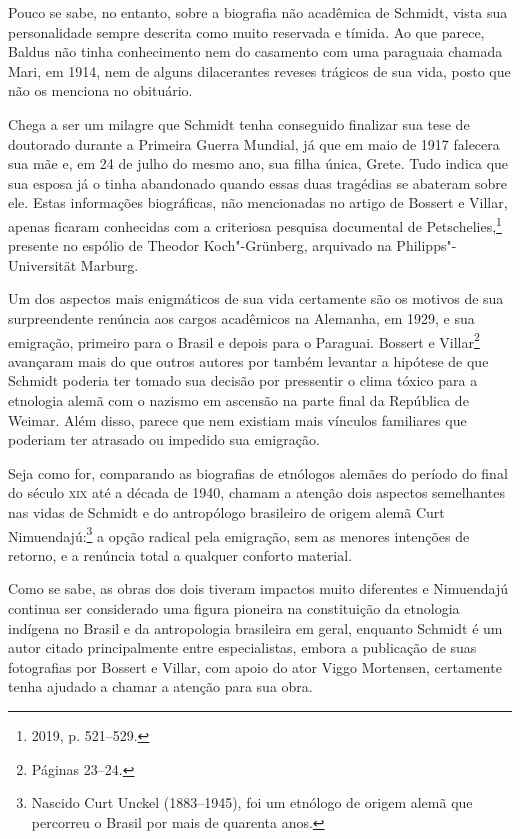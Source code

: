 Pouco se sabe, no entanto, sobre a biografia não acadêmica de Schmidt, vista sua personalidade sempre descrita como muito reservada e tímida. Ao que parece, Baldus não tinha conhecimento nem do casamento com uma paraguaia chamada Mari, em 1914, nem de alguns dilacerantes reveses trágicos de sua vida, posto que não os menciona no obituário.

Chega a ser um milagre que Schmidt tenha conseguido finalizar sua tese de doutorado durante a Primeira Guerra Mundial, já que em maio de 1917 falecera sua mãe e, em 24 de julho do mesmo ano, sua filha única, Grete. Tudo indica que sua esposa já o tinha abandonado quando essas duas tragédias se abateram sobre ele. Estas informações biográficas, não mencionadas no artigo de Bossert e Villar, apenas ficaram conhecidas com a criteriosa pesquisa documental de Petschelies,\footnote{2019, p. 521--529.} presente no espólio de Theodor Koch"-Grünberg, arquivado na Philipps"-Universität Marburg.

Um dos aspectos mais enigmáticos de sua vida certamente são os motivos de sua surpreendente renúncia aos cargos acadêmicos na Alemanha, em 1929, e sua emigração, primeiro para o Brasil e depois para o Paraguai. Bossert e Villar\footnote{Páginas 23--24.} avançaram mais do que outros autores por também levantar a hipótese de que Schmidt poderia ter tomado sua decisão por pressentir o clima tóxico para a etnologia alemã com o nazismo em ascensão na parte final da República de Weimar. Além disso, parece que nem existiam mais vínculos familiares que poderiam ter atrasado ou impedido sua emigração.

Seja como for, comparando as biografias de etnólogos alemães do período do final do século \textsc{xix} até a década de 1940, chamam a atenção dois aspectos semelhantes nas vidas de Schmidt e do antropólogo brasileiro de origem alemã Curt Nimuendajú:\footnote{Nascido Curt Unckel (1883--1945), foi um etnólogo de origem alemã que percorreu o Brasil por mais de quarenta anos.} a opção radical pela emigração, sem as menores intenções de retorno, e a renúncia total a qualquer conforto material. 

Como se sabe, as obras dos dois tiveram impactos muito diferentes e Nimuendajú continua ser considerado uma figura pioneira na constituição da etnologia indígena no Brasil e da antropologia brasileira em geral, enquanto Schmidt é um autor citado principalmente entre especialistas, embora a publicação de suas fotografias por Bossert e Villar, com apoio do ator Viggo Mortensen, certamente tenha ajudado a chamar a atenção para sua obra.

